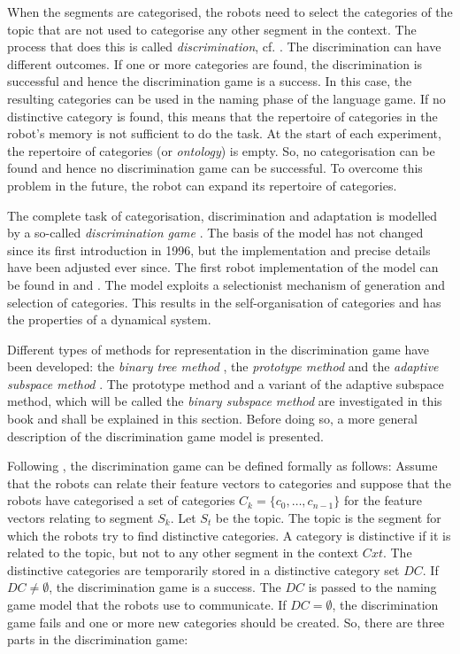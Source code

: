 When the segments are categorised, the robots need to select the categories of the topic that are not used to categorise any other segment in the context. The process that does this is called {\em discrimination}, cf. \citep{steels:1996b}. The discrimination can have different outcomes. If one or more categories are found, the discrimination is successful and hence the discrimination game is a success. In this case, the resulting categories can be used in the naming phase of the language game. If no distinctive category is found, this means that the repertoire of categories in the robot's memory is not sufficient to do the task.  At the start of each experiment, the repertoire of categories (or {\em ontology}) is empty. So, no categorisation can be found and hence no discrimination game can be successful. To overcome this problem in the future, the robot can expand its repertoire of categories.

The complete task of categorisation, discrimination and adaptation is modelled by a so-called {\em discrimination game} \citep{steels:1996b}. The basis of the model has not changed since its first introduction in 1996, but the implementation and precise details have been adjusted ever since. The first robot implementation of the model can be found in \citep{steelsvogt:1997} and \citep{vogt:1998a}. The model exploits a selectionist mechanism of generation and selection of categories. This results in the self-organisation of categories and has the properties of a dynamical system.

Different types of methods for representation in the discrimination game have been developed: the {\em binary tree method} \citep{steels:1996b}, the {\em prototype method} \citep{dejongvogt:1998,vogt:1998b} and the {\em adaptive subspace method} \citep{dejongvogt:1998,dejong:2000}. The prototype method and a variant of the adaptive subspace method, which will be called the {\em binary subspace method} are investigated in this book and shall be explained in this section. Before doing so, a more general description of the discrimination game model is presented.


Following \citep{steels:1996b}, the discrimination game can be defined formally as follows: Assume that the robots can relate their feature vectors to categories and suppose that the robots have categorised a set of categories $C_k=\{c_0,\ldots,c_{n-1}\}$ for the feature vectors relating to segment $S_k$. Let $S_t$ be the topic. The topic is the segment for which the robots try to find distinctive categories. A category is distinctive if it is related to the topic, but not to any other segment in the context $Cxt$. The distinctive categories are temporarily stored in a distinctive category set $DC$. If $DC \neq \emptyset$, the discrimination game is a success. The $DC$ is passed to the naming game model that the robots use to communicate. If $DC=\emptyset$, the discrimination game fails and one or more new categories should be created. So, there are three parts in the discrimination game:

